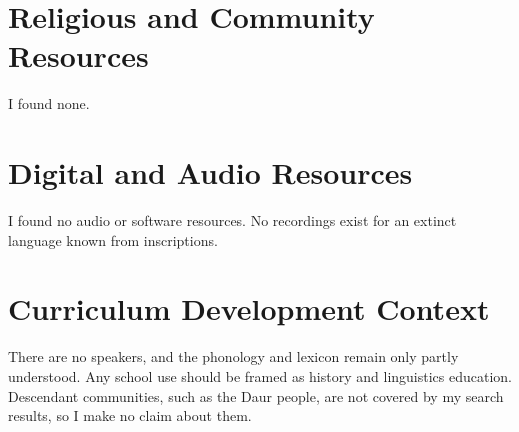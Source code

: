 \documentclass[12pt]{article}
\begin{document}
\section{Religious and Community Resources}
I found none.

\section{Digital and Audio Resources}
I found no audio or software resources. No recordings exist for an extinct language known from inscriptions.

\section{Curriculum Development Context}
There are no speakers, and the phonology and lexicon remain only partly understood. Any school use should be framed as history and linguistics education. Descendant communities, such as the Daur people, are not covered by my search results, so I make no claim about them.
\end{document}
